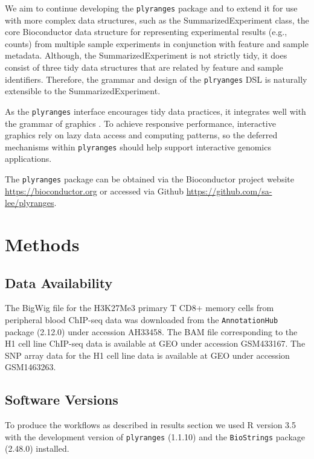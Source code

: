 \documentclass[]{article}
\begin{document}
We aim to continue developing the \texttt{plyranges} package and to
extend it for use with more complex data structures, such as the
SummarizedExperiment class, the core Bioconductor data structure for
representing experimental results (e.g., counts) from multiple sample
experiments in conjunction with feature and sample metadata. Although,
the SummarizedExperiment is not strictly tidy, it does consist of three
tidy data structures that are related by feature and sample identifiers.
Therefore, the grammar and design of the \texttt{plryanges} DSL is
naturally extensible to the SummarizedExperiment.

As the \texttt{plyranges} interface encourages tidy data practices, it
integrates well with the grammar of graphics \cite{Wickham2016-gz}. To
achieve responsive performance, interactive graphics rely on lazy data
access and computing patterns, so the deferred mechanisms within
\texttt{plyranges} should help support interactive genomics
applications.

The \texttt{plyranges} package can be obtained via the Bioconductor
project website \url{https://bioconductor.org} or accessed via Github
\url{https://github.com/sa-lee/plyranges}.

\hypertarget{methods}{%
\section{Methods}\label{methods}}

\hypertarget{data-availability}{%
\subsection{Data Availability}\label{data-availability}}

The BigWig file for the H3K27Me3 primary T CD8+ memory cells from
peripheral blood ChIP-seq data was downloaded from the
\texttt{AnnotationHub} package (2.12.0) under accession AH33458. The BAM
file corresponding to the H1 cell line ChIP-seq data is available at GEO
under accession GSM433167. The SNP array data for the H1 cell line data
is available at GEO under accession GSM1463263.

\hypertarget{software-versions}{%
\subsection{Software Versions}\label{software-versions}}

To produce the workflows as described in results section we used R
version 3.5 with the development version of \texttt{plyranges} (1.1.10)
and the \texttt{BioStrings} package (2.48.0) installed.
\end{document}
